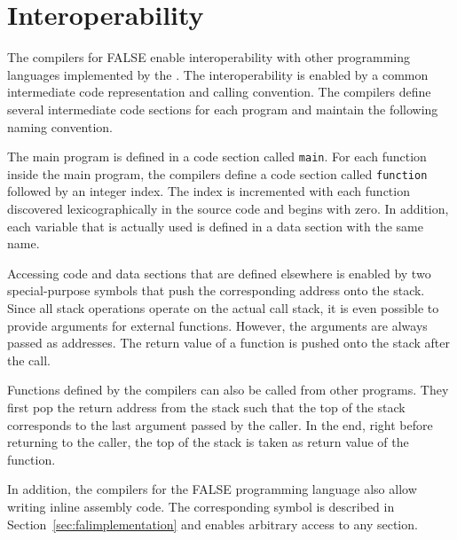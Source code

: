 \falprint
\falcheck
\faldump
\falrun
\falcpp
\falcode
\falamda
\falamdb
\falamdc
\falarma
\falarmb
\falarmc
\falarmcfpe
\falavr
\falavrtt
\falmabk
\falmibl
\falmipsa
\falmipsb
\falmmix
\falorok
\falppca
\falppcb
\falrisc
\falwasm
\falxtensa

\section{Interoperability}\label{sec:falinteroperability}

The compilers for FALSE enable interoperability with other programming languages implemented by the \ecs{}.
The interoperability is enabled by a common intermediate code representation and calling convention. \seecode
The compilers define several intermediate code sections for each program and maintain the following naming convention.

The main program is defined in a code section called \texttt{main}.
For each function inside the main program, the compilers define a code section called \texttt{function} followed by an integer index.
The index is incremented with each function discovered lexicographically in the source code and begins with zero.
In addition, each variable that is actually used is defined in a data section with the same name.

Accessing code and data sections that are defined elsewhere is enabled by two special-purpose symbols that push the corresponding address onto the stack.
Since all stack operations operate on the actual call stack, it is even possible to provide arguments for external functions.
However, the arguments are always passed as addresses.
The return value of a function is pushed onto the stack after the call.

Functions defined by the compilers can also be called from other programs.
They first pop the return address from the stack such that the top of the stack corresponds to the last argument passed by the caller.
In the end, right before returning to the caller, the top of the stack is taken as return value of the function.

In addition, the compilers for the FALSE programming language also allow writing inline assembly code.
The corresponding symbol is described in Section~\ref{sec:falimplementation} and enables arbitrary access to any section.
\seeassembly

\concludechapter
